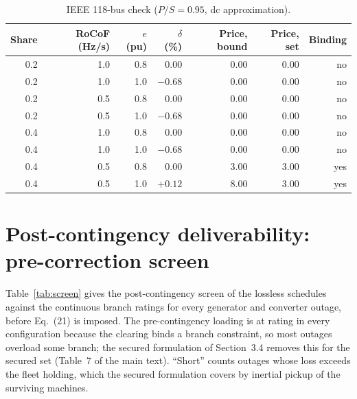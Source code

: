 \documentclass[11pt,a4paper]{article}
\begin{document}
\begin{table}[h]
  \caption{IEEE 118-bus check ($P/S = 0.95$, dc approximation).}
  \label{tab:s118}
  \centering
  \begin{tabular}{rrr rr rr}
    \toprule
    Share & RoCoF (Hz/s) & $e$ (pu) & $\delta$ (\%) & Price, bound & Price, set & Binding \\
    \midrule
    0.2 & 1.0 & 0.8 & 0.00 & 0.00 & 0.00 & no \\
    0.2 & 1.0 & 1.0 & $-0.68$ & 0.00 & 0.00 & no \\
    0.2 & 0.5 & 0.8 & 0.00 & 0.00 & 0.00 & no \\
    0.2 & 0.5 & 1.0 & $-0.68$ & 0.00 & 0.00 & no \\
    0.4 & 1.0 & 0.8 & 0.00 & 0.00 & 0.00 & no \\
    0.4 & 1.0 & 1.0 & $-0.68$ & 0.00 & 0.00 & no \\
    0.4 & 0.5 & 0.8 & 0.00 & 3.00 & 3.00 & yes \\
    0.4 & 0.5 & 1.0 & $+0.12$ & 8.00 & 3.00 & yes \\
    \bottomrule
  \end{tabular}
\end{table}

\section{Post-contingency deliverability: pre-correction screen}
\label{s:screen}

Table~\ref{tab:screen} gives the post-contingency screen of the lossless
schedules against the continuous branch ratings for every generator and
converter outage, before Eq.~(21) is imposed. The pre-contingency loading is
at rating in every configuration because the clearing binds a branch
constraint, so most outages overload some branch; the secured formulation of
Section~3.4 removes this for the secured set (Table~7 of the main text).
``Short'' counts outages whose loss exceeds the fleet holding, which the
secured formulation covers by inertial pickup of the surviving machines.
\end{document}
